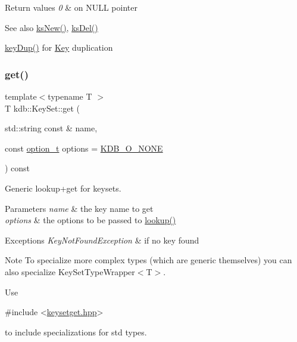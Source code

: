 \begin{DoxyRetVals}{Return values}
{\em 0} & on N\+U\+LL pointer \\
\hline
\end{DoxyRetVals}
\begin{DoxySeeAlso}{See also}
\hyperlink{group__keyset_ga671e1aaee3ae9dc13b4834a4ddbd2c3c}{ks\+New()}, \hyperlink{group__keyset_ga27e5c16473b02a422238c8d970db7ac8}{ks\+Del()} 

\hyperlink{group__key_gae6ec6a60cc4b8c1463fa08623d056ce3}{key\+Dup()} for \hyperlink{group__key}{Key} duplication 
\end{DoxySeeAlso}
\mbox{\label{classkdb_1_1KeySet_ad0b7d6498cf0b51ca6672704939a7f24}} 
\subsubsection{\texorpdfstring{get()}{get()}}
{\footnotesize\ttfamily template$<$typename T $>$ \\
T kdb\+::\+Key\+Set\+::get (\begin{DoxyParamCaption}\item[{std\+::string const \&}]{name,  }\item[{const \hyperlink{group__keyset_ga98a3d6a4016c9dad9cbd1a99a9c2a45a}{option\+\_\+t}}]{options = {\ttfamily \hyperlink{group__keyset_gga98a3d6a4016c9dad9cbd1a99a9c2a45aa00738455e0ae843c8720809d8287f370}{K\+D\+B\+\_\+\+O\+\_\+\+N\+O\+NE}} }\end{DoxyParamCaption}) const\hspace{0.3cm}{\ttfamily [inline]}}



Generic lookup+get for keysets. 


\begin{DoxyParams}{Parameters}
{\em name} & the key name to get \\
\hline
{\em options} & the options to be passed to \hyperlink{classkdb_1_1KeySet_a78125fb19c6aebb0d8fc1a7238b78ace}{lookup()}\\
\hline
\end{DoxyParams}

\begin{DoxyExceptions}{Exceptions}
{\em Key\+Not\+Found\+Exception} & if no key found\\
\hline
\end{DoxyExceptions}
\begin{DoxyNote}{Note}
To specialize more complex types (which are generic themselves) you can also specialize Key\+Set\+Type\+Wrapper$<$\+T$>$.
\end{DoxyNote}
Use 
\begin{DoxyCode}
\textcolor{preprocessor}{#include <\hyperlink{keysetget_8hpp}{keysetget.hpp}>}
\end{DoxyCode}
 to include specializations for std types.

